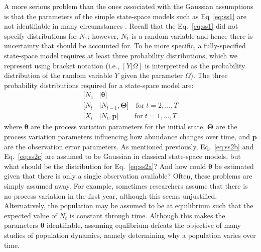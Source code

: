 \documentclass[12pt]{article}
\begin{document}
A more serious problem than the ones associated with the Gaussian
assumptions is that the parameters of the simple state-space models
such as Eq~\ref{eq:ss1} are not identifiable in many
circumstances \citep{polansky_etal:2009}. Recall that the
Eq.~\ref{eq:ss1} did not specify distributions for $N_1$; %
however, $N_1$ is a random variable and hence there is uncertainty
that should be accounted for.
To be more specific, a fully-specified state-space model requires at least
three probability distributions, which we represent
using bracket notation (i.e., $[Y|\Omega]$ is interpretted
as the probability distribution of the random variable $Y$ given the
parameter $\Omega$). The three probability distributions required for a
state-space model are:
\begin{subequations}
  \label{eq:ss2}
  \begin{align}
    [N_1&|\bm{\theta}] \label{eq:ss2a} \\ \label{eq:ss2b}
    [N_t&|N_{t-1},\bm{\Theta}] \quad \text{for} \; t=2,\hdots,T \\ \label{eq:ss2c}
    [X_t&|N_t,\bm{p}]  \qquad \; \text{for} \; t=1,\hdots,T
  \end{align}
\end{subequations}
where $\bm{\theta}$ are the process variation parameters for the
initial state, $\bm{\Theta}$ are the process variation parameters
influencing how abundance changes over time, and $\bm{p}$ are the
observation error parameters. As mentioned previously, Eq.~\ref{eq:ss2b}
and Eq.~\ref{eq:ss2c} are assumed to be Gaussian in classical state-space
models, but what should be the distribution for Eq.~\ref{eq:ss2a}?
And how could $\bm{\theta}$ be
estimated given that there is only a single observation available?
Often, these problems are simply assumed away. For
example, sometimes researchers assume that there is no process variation in
the first year, although this seems unjustified. Alternatively, the
population may be assumed to be at equilibrium such that the expected
value of $N_t$ is constant through time. Although this
makes the parameters $\bm{\theta}$ identifiable, assuming equlibrium
defeats the objective of many studies of population dynamics, namely
determining why a population varies over time.
\end{document}
